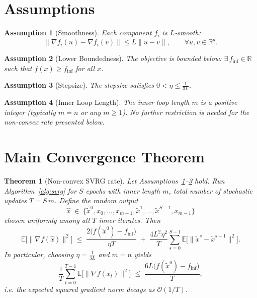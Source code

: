 \documentclass{article}
\newtheorem{theorem}{Theorem}
\newtheorem{assumption}{Assumption}
\newcommand{\E}{\mathbb{E}}
\newcommand{\R}{\mathbb{R}}
\begin{document}
\section*{Assumptions}
\begin{assumption}[Smoothness]\label{ass:smooth}
Each component $f_i$ is $L$‑smooth:
\[
\|\nabla f_i(u)-\nabla f_i(v)\|\le L\|u-v\|,\qquad\forall u,v\in\R^{d}.
\]
\end{assumption}
\begin{assumption}[Lower Boundedness]\label{ass:lb}
The objective is bounded below: $\exists\,f_{\inf}\in\R$ such that $f(x)\ge f_{\inf}$ for all $x$.
\end{assumption}
\begin{assumption}[Stepsize]\label{ass:step}
The stepsize satisfies $0<\eta\le\frac{1}{3L}$.
\end{assumption}
\begin{assumption}[Inner Loop Length]\label{ass:inner}
The inner loop length $m$ is a positive integer (typically $m=n$ or any $m\ge1$). No further restriction is needed for the non‑convex rate presented below.
\end{assumption}

\section*{Main Convergence Theorem}
\begin{theorem}[Non‑convex SVRG rate]\label{thm:main}
Let Assumptions~\ref{ass:smooth}–\ref{ass:step} hold. Run Algorithm~\ref{alg:svrg} for $S$ epochs with inner length $m$, total number of stochastic updates $T=S\,m$. Define the random output 
\[
\hat{x}\;\in\;\{\tilde{x}^{0},x_{0},\dots,x_{m-1},\tilde{x}^{1},\dots,\tilde{x}^{S-1},x_{m-1}\}
\]
chosen uniformly among all $T$ inner iterates. Then
\[
\E\!\big[\|\nabla f(\hat{x})\|^{2}\big]\;
\le\;
\frac{2\big(f(\tilde{x}^{0})-f_{\inf}\big)}{\eta T}
\;+\;
\frac{4L^{2}\eta^{2}}{T}\sum_{s=0}^{S-1}\E\!\big[\| \tilde{x}^{s}-\tilde{x}^{s-1}\|^{2}\big].
\tag{4}
\]
In particular, choosing $\eta=\frac{1}{3L}$ and $m=n$ yields
\[
\frac{1}{T}\sum_{t=0}^{T-1}\E\!\big[\|\nabla f(x_t)\|^{2}\big]\;\le\;
\frac{6L\big(f(\tilde{x}^{0})-f_{\inf}\big)}{T},
\tag{5}
\]
i.e. the expected squared gradient norm decays as $\mathcal{O}(1/T)$.
\end{theorem}
\end{document}
